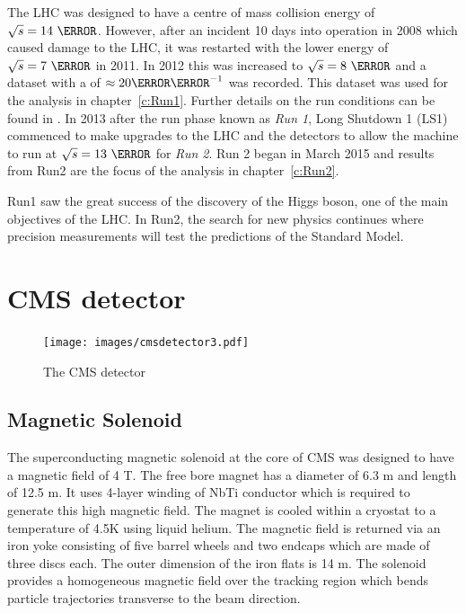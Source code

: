  The LHC was designed to have a centre of mass collision energy of $\sqrt{s} = 14~\TeV$. However, after an incident 10 days into operation in 2008 which caused damage to the LHC, it was restarted with the lower energy of $\sqrt{s} = 7~\TeV$ in 2011. In 2012 this was increased to $\sqrt{s} = 8~\TeV$ and a dataset with a  of $\approx 20 \fbinv$ was recorded. This dataset was used for the analysis in chapter~\ref{c:Run1}. Further details on the run conditions can be found in . In 2013 after the run phase known as \emph{Run 1}, Long Shutdown 1 (LS1) commenced to make upgrades to the LHC and the detectors to allow the machine to run at $\sqrt{s} = 13~\TeV$ for \emph{Run 2}. Run 2 began in March 2015 and results from Run2 are the focus of the analysis in chapter~\ref{c:Run2}.

Run1 saw the great success of the discovery of the Higgs boson, one of the main objectives of the LHC. In Run2, the search for new physics continues where precision measurements will test the predictions of the Standard Model.

\section{CMS detector \label{sec:CMSdet}
}

\begin{figure}[ht!]
\centering
    \texttt{[image: images/cmsdetector3.pdf]}
    \caption{The CMS detector~\cite{1742-6596-513-2-022032}}
    \label{fig:CMSdetector}
\end{figure}

\subsection{Magnetic Solenoid}

The superconducting magnetic solenoid at the core of CMS was designed to have a magnetic field of 4 T. The free bore magnet has a diameter of 6.3 m and length of 12.5 m. It uses 4-layer winding of NbTi conductor which is required to generate this high magnetic field. The magnet is cooled within a cryostat to a temperature of 4.5K using liquid helium. The magnetic field is returned via an iron yoke consisting of five barrel wheels and two endcaps which are made of three discs each. The outer dimension of the iron flats is 14 m.
The solenoid provides a homogeneous magnetic field over the tracking region which bends particle trajectories transverse to the beam direction.

